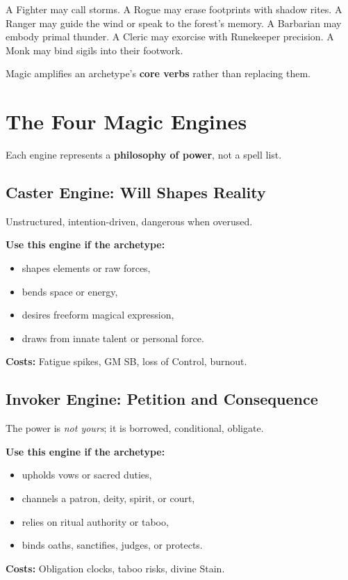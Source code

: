 \documentclass[11pt]{book}
\begin{document}
A Fighter may call storms.  
A Rogue may erase footprints with shadow rites.  
A Ranger may guide the wind or speak to the forest's memory.  
A Barbarian may embody primal thunder.  
A Cleric may exorcise with Runekeeper precision.  
A Monk may bind sigils into their footwork.

Magic amplifies an archetype's \textbf{core verbs} rather than replacing them.

\section{The Four Magic Engines}
Each engine represents a \textbf{philosophy of power}, not a spell list.

\subsection{Caster Engine: Will Shapes Reality}
Unstructured, intention-driven, dangerous when overused.

\textbf{Use this engine if the archetype:}
\begin{itemize}
  \item shapes elements or raw forces,
  \item bends space or energy,
  \item desires freeform magical expression,
  \item draws from innate talent or personal force.
\end{itemize}

\textbf{Costs:} Fatigue spikes, GM SB, loss of Control, burnout.

\subsection{Invoker Engine: Petition and Consequence}
The power is \emph{not yours}; it is borrowed, conditional, obligate.

\textbf{Use this engine if the archetype:}
\begin{itemize}
  \item upholds vows or sacred duties,
  \item channels a patron, deity, spirit, or court,
  \item relies on ritual authority or taboo,
  \item binds oaths, sanctifies, judges, or protects.
\end{itemize}

\textbf{Costs:} Obligation clocks, taboo risks, divine Stain.
\end{document}
